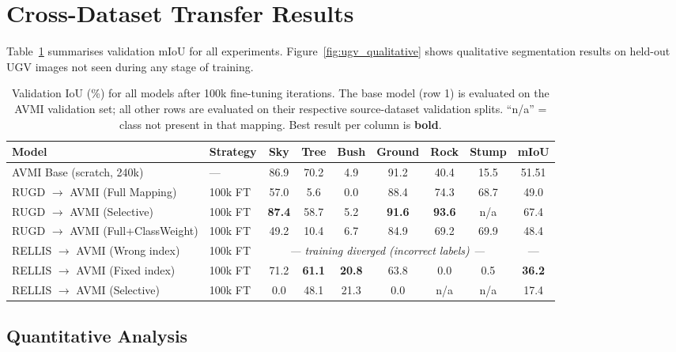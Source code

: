 \section{Cross-Dataset Transfer Results}
\label{sec:results}

Table~\ref{tab:results} summarises validation mIoU for all experiments.
Figure~\ref{fig:ugv_qualitative} shows qualitative segmentation results on
held-out UGV images not seen during any stage of training.

\begin{table}[t]
\centering
\caption{Validation IoU (\%) for all models after 100k fine-tuning iterations.
         The base model (row 1) is evaluated on the AVMI validation set;
         all other rows are evaluated on their respective source-dataset
         validation splits.  ``n/a'' = class not present in that mapping.
         Best result per column is \textbf{bold}.}
\label{tab:results}
\renewcommand{\arraystretch}{1.15}
\begin{tabular}{llccccccc}
\toprule
\textbf{Model} & \textbf{Strategy} &
  \textbf{Sky} & \textbf{Tree} & \textbf{Bush} &
  \textbf{Ground} & \textbf{Rock} & \textbf{Stump} & \textbf{mIoU} \\
\midrule
AVMI Base (scratch, 240k) & ---
  & 86.9 & 70.2 & 4.9 & 91.2 & 40.4 & 15.5 & 51.51 \\
\midrule
RUGD $\to$ AVMI (Full Mapping)
  & 100k FT
  & 57.0 &  5.6 & 0.0 & 88.4 & 74.3 & 68.7 & 49.0  \\
RUGD $\to$ AVMI (Selective)
  & 100k FT
  & \textbf{87.4} & 58.7 & 5.2 & \textbf{91.6} & \textbf{93.6} & n/a  & 67.4  \\
RUGD $\to$ AVMI (Full+ClassWeight)
  & 100k FT
  & 49.2 & 10.4 & 6.7 & 84.9 & 69.2 & 69.9 & 48.4  \\
\midrule
RELLIS $\to$ AVMI (Wrong index)
  & 100k FT
  & \multicolumn{6}{c}{\textit{--- training diverged (incorrect labels) ---}} & --- \\
RELLIS $\to$ AVMI (Fixed index)
  & 100k FT
  & 71.2 & \textbf{61.1} & \textbf{20.8} & 63.8 & 0.0 & 0.5 & \textbf{36.2} \\
RELLIS $\to$ AVMI (Selective)
  & 100k FT
  &  0.0 & 48.1 & 21.3 &  0.0 & n/a  & n/a  & 17.4  \\
\bottomrule
\end{tabular}
\end{table}

\subsection{Quantitative Analysis}

